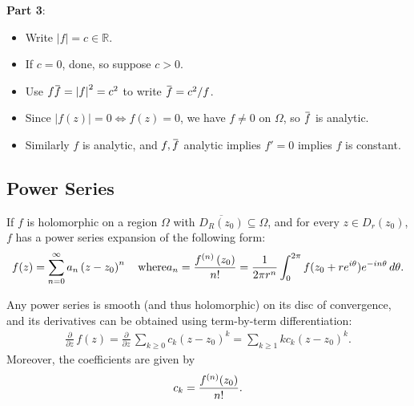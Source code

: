 \begin{solution}

\textbf{Part 3}:

\begin{itemize}
\tightlist
\item
  Write \({\left\lvert {f} \right\rvert} = c \in {\mathbb{R}}\).
\item
  If \(c=0\), done, so suppose \(c>0\).
\item
  Use
  \(f\mkern 1.5mu\overline{\mkern-1.5muf\mkern-1.5mu}\mkern 1.5mu = {\left\lvert {f} \right\rvert}^2 = c^2\)
  to write
  \(\mkern 1.5mu\overline{\mkern-1.5muf\mkern-1.5mu}\mkern 1.5mu=c^2/f\).
\item
  Since \({\left\lvert {f(z)} \right\rvert} = 0 \iff f(z) = 0\), we have
  \(f\neq 0\) on \(\Omega\), so
  \(\mkern 1.5mu\overline{\mkern-1.5muf\mkern-1.5mu}\mkern 1.5mu\) is
  analytic.
\item
  Similarly \(f\) is analytic, and
  \(f,\mkern 1.5mu\overline{\mkern-1.5muf\mkern-1.5mu}\mkern 1.5mu\)
  analytic implies \(f'=0\) implies \(f\) is constant.
\end{itemize}

\end{solution}


\hypertarget{power-series}{%
\subsection{Power Series}\label{power-series}}

\begin{theorem}

If \(f\) is holomorphic on a region \(\Omega\) with
\(\overline{ D_R(z_0)} \subseteq \Omega\), and for every
\(z\in D_r(z_0)\), \(f\) has a power series expansion of the following
form:
\begin{align*}
f(z)=\sum_{n=0}^{\infty} a_{n}\left(z-z_{0}\right)^{n} \quad\text{where} a_{n}=\frac{f^{(n)}\left(z_{0}\right)}{n !}
= {1 \over 2\pi r^n}\int_0^{2\pi} f(z_0 + re^{i\theta})e^{-in\theta} \,d\theta
.\end{align*}

\end{theorem}

\begin{proposition}

Any power series is smooth (and thus holomorphic) on its disc of
convergence, and its derivatives can be obtained using term-by-term
differentiation:
\begin{align*}
{\frac{\partial }{\partial z}\,} f(z) = {\frac{\partial }{\partial z}\,} \sum_{k\geq 0} c_k (z-z_0)^k = \sum_{k\geq 1} kc_k (z-z_0)^k
.\end{align*}
Moreover, the coefficients are given by
\begin{align*}
c_k = {f^{(n)}(z_0) \over n! }
.\end{align*}

\end{proposition}

